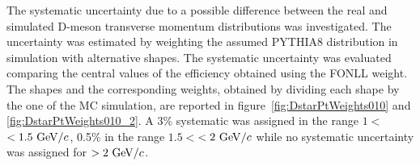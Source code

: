 
The systematic uncertainty due to a possible diﬀerence between the real and simulated D-meson transverse momentum distributions was investigated. The uncertainty was estimated by weighting the assumed PYTHIA8 \Dstar \pt distribution in simulation with alternative \pt shapes. The systematic uncertainty was evaluated comparing the central values of the efficiency obtained using the FONLL \pt weight. The \pt shapes and the corresponding \pt weights, obtained by dividing each shape by the one of the MC simulation, are reported in figure~\ref{fig:DstarPtWeights010} and \ref{fig:DstarPtWeights010_2}. A 3\% systematic was assigned in the range $1<$\pt$<1.5~{\rm GeV}/c$, 0.5\%  in the range $1.5<$\pt$<2~{\rm GeV}/c$ while no systematic uncertainty was assigned for \pt$>2~{\rm GeV}/c$. \\




